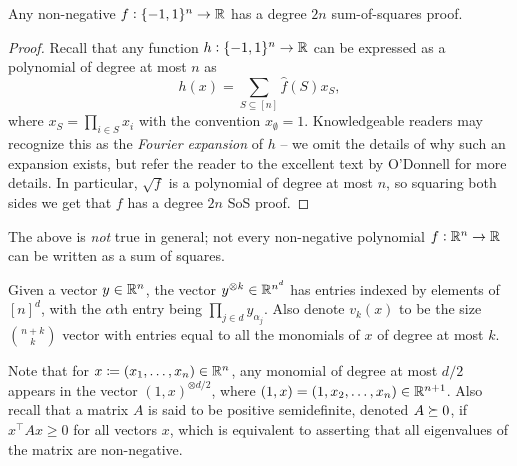 	\begin{fprop}
		\label{prop: deg-2n-sos}
		Any non-negative $f : \{-1,1\}^n \to \mathbb{R}$ has a degree $2n$ sum-of-squares proof.
	\end{fprop}
	\begin{proof}
		Recall that any function $h : \{-1,1\}^n \to \mathbb{R}$ can be expressed as a polynomial of degree at most $n$ as
		\[ h(x) = \sum_{S \subseteq [n]} \hat{f}(S) x_S, \]
		where $x_S = \prod_{i \in S} x_i$ with the convention $x_\emptyset = 1$. Knowledgeable readers may recognize this as the \emph{Fourier expansion} of $h$ -- we omit the details of why such an expansion exists, but refer the reader to the excellent text by O'Donnell \cite{bfa_od} for more details. In particular, $\sqrt{f}$ is a polynomial of degree at most $n$, so squaring both sides we get that $f$ has a degree $2n$ SoS proof.
	\end{proof}

	The above is \emph{not} true in general; not every non-negative polynomial $f : \mathbb{R}^n \to \mathbb{R}$ can be written as a sum of squares.

	\begin{definition}
		Given a vector $y \in \mathbb{R}^n$, the vector $y^{\otimes k} \in \mathbb{R}^{n^d}$ has entries indexed by elements of $[n]^d$, with the $\alpha$th entry being $\prod_{j \in d} y_{\alpha_j}$. Also denote $v_k(x)$ to be the size $\binom{n+k}{k}$ vector with entries equal to all the monomials of $x$ of degree at most $k$.
	\end{definition}
	Note that for $x \coloneqq (x_1,\ldots,x_n) \in \mathbb{R}^n$, any monomial of degree at most $d/2$ appears in the vector $(1,x)^{\otimes d/2}$, where $(1,x) = (1,x_2,\ldots,x_n) \in \mathbb{R}^{n+1}$. Also recall that a matrix $A$ is said to be positive semidefinite, denoted $A \succeq 0$, if $x^\top A x \ge 0$ for all vectors $x$, which is equivalent to asserting that all eigenvalues of the matrix are non-negative.

